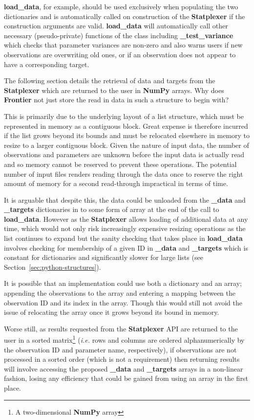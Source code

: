 \textbf{load\_data}, for example, should be used exclusively when populating
the two dictionaries and is automatically called on construction of the
\textbf{Statplexer} if the construction arguments are valid.
\textbf{load\_data} will automatically call other necessary (pseudo-private)
functions of the class including \textbf{\_test\_variance} which checks that
parameter variances are non-zero and also warns users if new observations
are overwriting old ones, or if an observation does not appear to have a
corresponding target.

The following section details the retrieval of data and targets from the
\textbf{Statplexer} which are returned to the user in \textbf{NumPy} arrays. Why
does \textbf{Frontier} not just store the read in data in such a structure to
begin with?

This is primarily due to the underlying layout of a list structure, which must
be represented in memory as a contiguous block. Great expense is therefore
incurred if the list grows beyond its bounds and must be relocated elsewhere in
memory to resize to a larger contiguous block. Given the nature of input data,
the number of observations and parameters are unknown before the input
data is actually read and so memory cannot be reserved to prevent these operations.
The potential number of input files renders reading through the data once to
reserve the right amount of memory for a second read-through impractical in
terms of time.

It is arguable that despite this, the data could be unloaded from the
\textbf{\_data} and \textbf{\_targets} dictionaries in to some form of array at
the end of the call to \textbf{load\_data}. However as the \textbf{Statplexer}
allows loading of additional data at any time, which would not only risk
increasingly expensive resizing operations as the list continues to expand but
the sanity checking that takes place in \textbf{load\_data} involves checking
for membership of a given ID in \textbf{\_data} and \textbf{\_targets} which is
constant for dictionaries and significantly slower for large lists (see
Section~\ref{sec:python-structures}).

It is possible that an implementation could use both a dictionary and an array;
appending the observations to the array and entering a mapping between the
observation ID and its index in the array.  Though this would still not avoid
the issue of relocating the array once it grows beyond its bound in memory.

Worse still, as results requested from the \textbf{Statplexer} API are returned
to the user in a sorted matrix\footnote{A two-dimensional \textbf{NumPy} array}
(\textit{i.e.} rows and columns are ordered alphanumerically by the observation
ID and parameter name, respectively), if observations are not processed in a
sorted order (which is not a requirement) then returning results will involve
accessing the proposed \textbf{\_data} and \textbf{\_targets} arrays in a
non-linear fashion, losing any efficiency that could be gained from using an
array in the first place.

